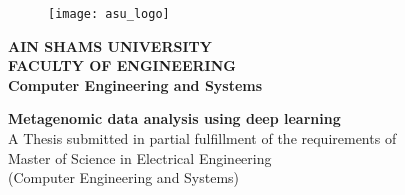 \thispagestyle{empty} %

\begin{center}
\begin{figure}
  \begin{center}
    \texttt{[image: asu\_logo]}
  \end{center}
\end{figure}
\small
\textbf{AIN SHAMS UNIVERSITY\\
	FACULTY OF ENGINEERING\\
	Computer Engineering and Systems}



\vfill
\Large
\textbf{Metagenomic data analysis using deep learning} \\ 

\vfill
\small
A Thesis submitted in partial fulfillment of the requirements of \\ 
 Master of Science in Electrical Engineering  \\
(Computer Engineering and Systems)\\









\end{center}
